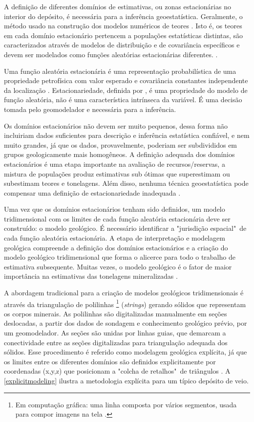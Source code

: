 A definição de diferentes domínios de estimativas, ou zonas estacionárias no interior do depósito, é necessária para a inferência geoestatística. Geralmente, o método usado na construção dos modelos numéricos de teores \cite{mclennanstationarity}. Isto é, os teores em cada domínio estacionário pertencem a populações estatísticas distintas, são caracterizados através de modelos de distribuição e de covariância específicos e devem ser modelados como funções aleatórias estacionárias diferentes. \cite{journel1978mining}. 

Uma função aleatória estacionária é uma representação probabilística de uma propriedade petrofísica com valor esperado e covariância constantes independente da localização \cite{mclennanstationarity}. Estacionariedade, definida por , é uma propriedade do modelo de função aleatória, não é uma característica intrínseca da variável. É uma decisão tomada pelo geomodelador e necessária para a inferência.

Os domínios estacionários não devem ser muito pequenos, dessa forma não incluiriam dados suficientes para descrição e inferência estatística confiável, e nem muito grandes, já que os dados, provavelmente, poderiam ser subdivididos em grupos geologicamente mais homogêneos. A definição adequada dos domínios estacionários é uma etapa importante na avaliação de recursos/reservas, a mistura de populações produz estimativas sub ótimas que superestimam ou subestimam teores e tonelagens. Além disso, nenhuma técnica geoestatística pode compensar uma definição de estacionariedade inadequada \cite{rossi2013mineral}.

Uma vez que os domínios estacionários tenham sido definidos, um modelo tridimensional com os limites de cada função aleatória estacionária deve ser construído: o modelo geológico. É necessário identificar a "jurisdição espacial"\ de cada função aleatória estacionária. A etapa de interpretação e modelagem geológica compreende a definição dos domínios estacionários e a criação do modelo geológico tridimensional que forma o alicerce para todo o trabalho de estimativa subsequente. Muitas vezes, o modelo geológico é o fator de maior importância na estimativas das tonelagens mineralizadas \cite{rossi2013mineral}.

A abordagem tradicional para a criação de modelos geológicos tridimensionais é através da triangulação de polilinhas \footnote{Em computação gráfica: uma linha composta por vários segmentos, usada para compor imagens na tela \cite{oxfordonlinedictionary}.} (\textit{strings}) gerando sólidos que representam os corpos minerais. As polilinhas são digitalizadas manualmente em seções deslocadas, a partir dos dados de sondagem e conhecimento geológico prévio, por um geomodelador. As seções são unidas por linhas guias, que demarcam a conectividade entre as seções digitalizadas para triangulação adequada dos sólidos. Esse procedimento é referido como modelagem geológica explícita, já que os limites entre os diferentes domínios são definidos explicitamente por coordenadas (x,y,z) que posicionam a "colcha de retalhos"\ de triângulos \cite{mclennan2006boundsim,cowan2003practical}. A \autoref{explicitmodeling} ilustra a metodologia explícita para um típico depósito de veio.

